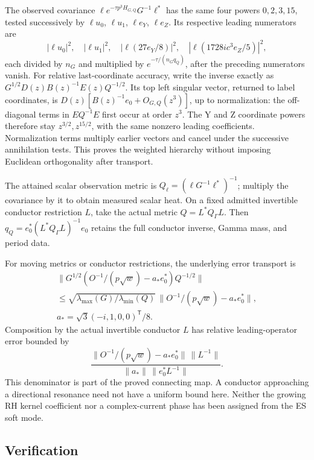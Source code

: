 \documentclass[11pt]{article}
\begin{document}
The observed covariance \(\ell e^{-\tau p^3H_{G,Q}}G^{-1}\ell^*\) has the same four powers \(0,2,3,15\), tested successively by \(\ell u_0\), \(\ell u_1\), \(\ell e_Y\), \(\ell e_Z\). Its respective leading numerators are \[
|\ell u_0|^2,\quad |\ell u_1|^2,\quad |\ell(27e_Y/8)|^2,
\quad |\ell(1728ic^3e_Z/5)|^2,
\tag{ES35}
\] each divided by \(n_G\) and multiplied by \(e^{-\tau/(n_Gq_Q)}\), after the preceding numerators vanish. For relative last-coordinate accuracy, write the inverse exactly as \(G^{1/2}D(z)B(z)^{-1}E(z)Q^{-1/2}\). Its top left singular vector, returned to label coordinates, is \(D(z)[B(z)^{-1}e_0+O_{G,Q}(z^3)]\), up to normalization: the off-diagonal terms in \(E Q^{-1}E\) first occur at order \(z^3\). The Y and Z coordinate powers therefore stay \(z^{3/2},z^{15/2}\), with the same nonzero leading coefficients. Normalization terms multiply earlier vectors and cancel under the successive annihilation tests. This proves the weighted hierarchy without imposing Euclidean orthogonality after transport.

The attained scalar observation metric is \(Q_\ell=(\ell G^{-1}\ell^*)^{-1}\); multiply the covariance by it to obtain measured scalar heat. On a fixed admitted invertible conductor restriction \(L\), take the actual metric \(Q=L^*Q_\Gamma L\). Then \(q_Q=e_0^*(L^*Q_\Gamma L)^{-1}e_0\) retains the full conductor inverse, Gamma mass, and period data.

For moving metrics or conductor restrictions, the underlying error transport is \[
\begin{gathered}
\|G^{1/2}(O^{-1}/(p\sqrt w)-a_*e_0^*)Q^{-1/2}\|\\
\le\sqrt{\lambda_{\max}(G)/\lambda_{\min}(Q)}\,
\|O^{-1}/(p\sqrt w)-a_*e_0^*\|,\\
a_*=\sqrt3(-i,1,0,0)^{\mathsf T}/8.
\end{gathered}
\tag{ES36}
\] Composition by the actual invertible conductor \(L\) has relative leading-operator error bounded by \[
\frac{\|O^{-1}/(p\sqrt w)-a_*e_0^*\|\,\|L^{-1}\|}
{\|a_*\|\,\|e_0^*L^{-1}\|}.
\tag{ES37}
\] This denominator is part of the proved connecting map. A conductor approaching a directional resonance need not have a uniform bound here. Neither the growing RH kernel coefficient nor a complex-current phase has been assigned from the ES soft mode.

\subsection{Verification}\label{verification}
\end{document}
